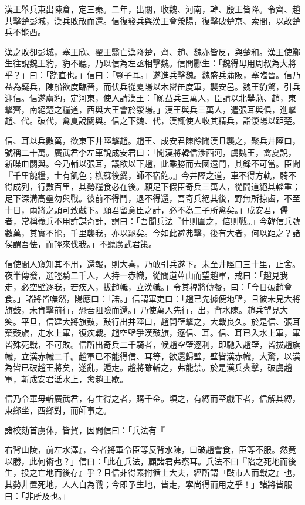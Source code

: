 \begin{pinyinscope}
漢王舉兵東出陳倉，定三秦。二年，出關，收魏、河南，韓、殷王皆降。令齊、趙共擊楚彭城，漢兵敗散而還。信復發兵與漢王會滎陽，復擊破楚京、索間，以故楚兵不能西。

漢之敗卻彭城，塞王欣、翟王翳亡漢降楚，齊、趙、魏亦皆反，與楚和。漢王使酈生往說魏王豹，豹不聽，乃以信為左丞相擊魏。信問酈生：「魏得毋用周叔為大將乎？」曰：「跷直也。」信曰：「豎子耳。」遂進兵擊魏。魏盛兵蒲阪，塞臨晉。信乃益為疑兵，陳船欲度臨晉，而伏兵從夏陽以木罌缶度軍，襲安邑。魏王豹驚，引兵迎信。信遂虜豹，定河東，使人請漢王：「願益兵三萬人，臣請以北舉燕、趙，東擊齊，南絕楚之糧道，西與大王會於滎陽。」漢王與兵三萬人，遣張耳與俱，進擊趙、代。破代，禽夏說閼與。信之下魏、代，漢輒使人收其精兵，詣滎陽以距楚。

信、耳以兵數萬，欲東下井陘擊趙。趙王、成安君陳餘聞漢且襲之，聚兵井陘口，號稱二十萬。廣武君李左車說成安君曰：「聞漢將韓信涉西河，虜魏王，禽夏說，新喋血閼與。今乃輔以張耳，議欲以下趙，此乘勝而去國遠鬥，其鋒不可當。臣聞『千里餽糧，士有飢色；樵蘇後爨，師不宿飽。』今井陘之道，車不得方軌，騎不得成列，行數百里，其勢糧食必在後。願足下假臣奇兵三萬人，從間道絕其輜重；足下深溝高壘勿與戰。彼前不得鬥，退不得還，吾奇兵絕其後，野無所掠鹵，不至十日，兩將之頭可致戲下。願君留意臣之計，必不為二子所禽矣。」成安君，儒者，常稱義兵不用詐謀奇計，謂曰：「吾聞兵法『什則圍之，倍則戰。』今韓信兵號數萬，其實不能，千里襲我，亦以罷矣。今如此避弗擊，後有大者，何以距之？諸侯謂吾怯，而輕來伐我。」不聽廣武君策。

信使間人窺知其不用，還報，則大喜，乃敢引兵遂下。未至井陘口三十里，止舍。夜半傳發，選輕騎二千人，人持一赤幟，從間道萆山而望趙軍，戒曰：「趙見我走，必空壁逐我，若疾入，拔趙幟，立漢幟。」令其裨將傳餐，曰：「今日破趙會食。」諸將皆嘸然，陽應曰：「諾。」信謂軍吏曰：「趙已先據便地壁，且彼未見大將旗鼓，未肯擊前行，恐吾阻險而還。」乃使萬人先行，出，背水陳。趙兵望見大笑。平旦，信建大將旗鼓，鼓行出井陘口，趙開壁擊之，大戰良久。於是信、張耳棄鼓旗，走水上軍，復疾戰。趙空壁爭漢鼓旗，逐信、耳。信、耳已入水上軍，軍皆殊死戰，不可敗。信所出奇兵二千騎者，候趙空壁逐利，即馳入趙壁，皆拔趙旗幟，立漢赤幟二千。趙軍已不能得信、耳等，欲還歸壁，壁皆漢赤幟，大驚，以漢為皆已破趙王將矣，遂亂，遁走。趙將雖斬之，弗能禁。於是漢兵夾擊，破虜趙軍，斬成安君泜水上，禽趙王歇。

信乃令軍毋斬廣武君，有生得之者，購千金。頃之，有縛而至戲下者，信解其縛，東鄉坐，西鄉對，而師事之。

諸校劾首虜休，皆賀，因問信曰：「兵法有『

右背山陵，前左水澤』，今者將軍令臣等反背水陳，曰破趙會食，臣等不服。然竟以勝，此何術也？」信曰：「此在兵法，顧諸君弗察耳。兵法不曰『陷之死地而後生，投之亡地而後存』乎？且信非得素拊循士大夫，經所謂『敺市人而戰之』也，其勢非置死地，人人自為戰；今即予生地，皆走，寧尚得而用之乎！」諸將皆服曰：「非所及也。」


\end{pinyinscope}
